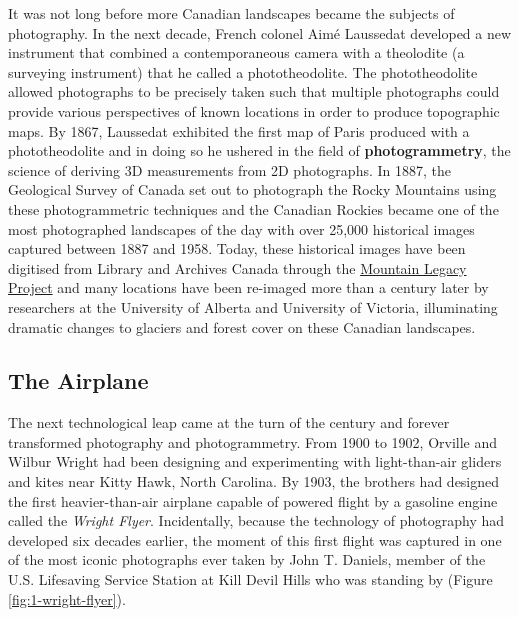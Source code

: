 \documentclass[
]{book}
\begin{document}
It was not long before more Canadian landscapes became the subjects of photography. In the next decade, French colonel Aimé Laussedat developed a new instrument that combined a contemporaneous camera with a theolodite (a surveying instrument) that he called a phototheodolite. The phototheodolite allowed photographs to be precisely taken such that multiple photographs could provide various perspectives of known locations in order to produce topographic maps. By 1867, Laussedat exhibited the first map of Paris produced with a phototheodolite and in doing so he ushered in the field of \textbf{photogrammetry}, the science of deriving 3D measurements from 2D photographs. In 1887, the Geological Survey of Canada set out to photograph the Rocky Mountains using these photogrammetric techniques and the Canadian Rockies became one of the most photographed landscapes of the day with over 25,000 historical images captured between 1887 and 1958. Today, these historical images have been digitised from Library and Archives Canada through the \href{http://mountainlegacy.ca/}{Mountain Legacy Project} and many locations have been re-imaged more than a century later by researchers at the University of Alberta and University of Victoria, illuminating dramatic changes to glaciers and forest cover on these Canadian landscapes.

\hypertarget{the-airplane}{%
\subsection{The Airplane}\label{the-airplane}}

The next technological leap came at the turn of the century and forever transformed photography and photogrammetry. From 1900 to 1902, Orville and Wilbur Wright had been designing and experimenting with light-than-air gliders and kites near Kitty Hawk, North Carolina. By 1903, the brothers had designed the first heavier-than-air airplane capable of powered flight by a gasoline engine called the \emph{Wright Flyer}. Incidentally, because the technology of photography had developed six decades earlier, the moment of this first flight was captured in one of the most iconic photographs ever taken by John T. Daniels, member of the U.S. Lifesaving Service Station at Kill Devil Hills who was standing by (Figure \ref{fig:1-wright-flyer}).
\end{document}
